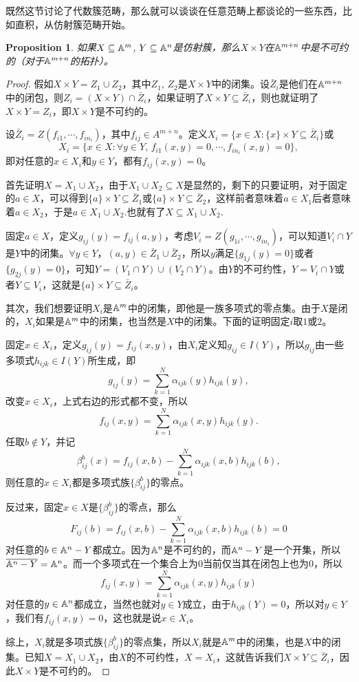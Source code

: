 \documentclass[9pt]{extbook}
\theoremstyle{plain}%
\newtheorem{pro}[defi]{Proposition}%
\begin{document}
既然这节讨论了代数簇范畴，那么就可以谈谈在任意范畴上都谈论的一些东西，比如直积，从仿射簇范畴开始。
\begin{pro}
	如果$X\subseteq \mathbb{A}^{m}$, $Y\subseteq \mathbb{A}^{n}$是仿射簇，那么$X\times Y$在$\mathbb{A}^{m+n}$中是不可约的（对于$\mathbb{A}^{m+n}$的拓扑）。
	\label{c3:p18}
\end{pro}
\begin{proof}
	假如$X\times Y=Z_1\cup Z_2$，其中$Z_1$, $Z_2$是$X\times Y$中的闭集。设$\bar{Z}_i$是他们在$\mathbb{A}^{m+n}$中的闭包，则$Z_i=(X\times Y)\cap \bar{Z}_i$，如果证明了$X\times Y\subseteq \bar{Z}_i$，则也就证明了$X\times Y=Z_i$，即$X\times Y$是不可约的。

	设$\bar{Z}_i=Z(f_{i1},\cdots,f_{in_i})$，其中$f_{ij}\in A^{m+n}$。定义$X_i=\bigl\{x\in X:\{x\}\times Y\subseteq \bar{Z}_i\bigr\}$或
	\[
		X_i=\bigl\{x\in X:\forall y\in Y,\,f_{i1}(x,y)=0,\cdots ,f_{in_i}(x,y)=0\bigr\},
	\]
	即对任意的$x\in X_i$和$y\in Y$，都有$f_{ij}(x,y)=0$。

	首先证明$X=X_1\cup X_2$，由于$X_1\cup X_2\subseteq X$是显然的，剩下的只要证明，对于固定的$a\in X$，可以得到$\{a\}\times Y\subseteq \bar{Z}_1$或$\{a\}\times Y\subseteq \bar{Z}_2$，这样前者意味着$a\in X_1$后者意味着$a\in X_2$，于是$a\in X_1\cup X_2$.也就有了$X\subseteq X_1\cup X_2$.

	固定$a\in X$，定义$g_{ij}(y)=f_{ij}(a,y)$，考虑$V_i=Z(g_{1i},\cdots,g_{in_i})$，可以知道$V_i\cap Y$是$Y$中的闭集。$\forall y\in Y$，$(a,y)\in \bar{Z}_1 \cup \bar{Z}_2$，所以$y$满足$\{g_{1j}(y)=0\}$或者$\{g_{2j}(y)=0\}$，可知$Y=(V_1\cap Y)\cup (V_2\cap Y)$。由$Y$的不可约性，$Y=V_i\cap Y$或者$Y\subseteq V_i$，这就是$\{a\}\times Y\subseteq \bar{Z}_i$。

	其次，我们想要证明$X_i$是$\mathbb{A}^{m}$中的闭集，即他是一族多项式的零点集。由于$X$是闭的，$X_i$如果是$\mathbb{A}^{m}$中的闭集，也当然是$X$中的闭集。下面的证明固定$i$取$1$或$2$。

	固定$x\in X_i$，定义$g_{ij}(y)=f_{ij}(x,y)$，由$X_i$定义知$g_{ij}\in I(Y)$，所以$g_{ij}$由一些多项式$h_{ijk}\in I(Y)$所生成，即
	\[
		g_{ij}(y)=\sum_{k=1}^N\alpha_{ijk}(y)h_{ijk}(y),
	\]
	改变$x\in X_i$，上式右边的形式都不变，所以
	\[
		f_{ij}(x,y)=\sum_{k=1}^N\alpha_{ijk}(x,y)h_{ijk}(y).
	\]
	任取$b\notin Y$，并记
	\[
		\beta_{ij}^b(x)=f_{ij}(x,b)-\sum_{k=1}^N\alpha_{ijk}(x,b)h_{ijk}(b),
	\]
	则任意的$x\in X_i$都是多项式族$\{\beta_{ij}^b\}$的零点。

	反过来，固定$x\in X$是$\{\beta_{ij}^b\}$的零点，那么
	\[
		F_{ij}(b)=f_{ij}(x,b)-\sum_{k=1}^N\alpha_{ijk}(x,b)h_{ijk}(b)=0
	\]
	对任意的$b\in \mathbb{A}^{n}-Y$都成立。因为$\mathbb{A}^{n}$是不可约的，而$\mathbb{A}^{n}-Y$是一个开集，所以$\overline{\mathbb{A}^{n}-Y}=\mathbb{A}^{n}$。而一个多项式在一个集合上为$0$当前仅当其在闭包上也为$0$，所以
	\[
		f_{ij}(x,y)=\sum_{k=1}^N\alpha_{ijk}(x,y)h_{ijk}(y)
	\]
	对任意的$y\in \mathbb{A}^{n}$都成立，当然也就对$y\in Y$成立，由于$h_{ijk}(Y)=0$，所以对$y\in Y$，我们有$f_{ij}(x,y)=0$，这也就是说$x\in X_i$。

	综上，$X_i$就是多项式族$\{\beta_{ij}^b\}$的零点集，所以$X_i$就是$\mathbb{A}^{m}$中的闭集，也是$X$中的闭集。已知$X=X_1\cup X_2$，由$X$的不可约性，$X=X_i$，这就告诉我们$X\times Y\subseteq \bar{Z}_i$，因此$X\times Y$是不可约的。
\end{proof}
\end{document}
